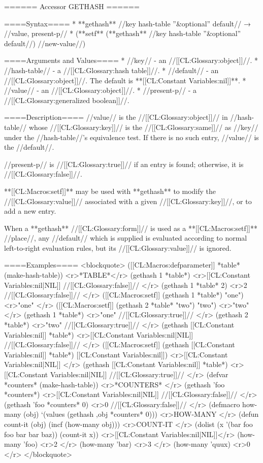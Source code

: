 ====== Accessor GETHASH ======

====Syntax====
  * **gethash** //key hash-table ''&optional'' default// → //value, present-p// 
  * (**setf** (**gethash** //key hash-table ''&optional'' default//) //new-value//)

====Arguments and Values====
  * //key// - an //[[CL:Glossary:object]]//.
  * //hash-table// - a //[[CL:Glossary:hash table]]//.
  * //default// - an //[[CL:Glossary:object]]//. The default is **[[CL:Constant Variables:nil]]**.
  * //value// - an //[[CL:Glossary:object]]//.
  * //present-p// - a //[[CL:Glossary:generalized boolean]]//.

====Description====
//value// is the //[[CL:Glossary:object]]// in //hash-table// whose //[[CL:Glossary:key]]// is the //[[CL:Glossary:same]]// as //key// under the //hash-table//'s equivalence test. If there is no such entry, //value// is the //default//.

//present-p// is //[[CL:Glossary:true]]// if an entry is found; otherwise, it is //[[CL:Glossary:false]]//.

**[[CL:Macros:setf]]** may be used with **gethash** to modify the //[[CL:Glossary:value]]// associated with a given //[[CL:Glossary:key]]//, or to add a new entry.

When a **gethash** //[[CL:Glossary:form]]// is used as a **[[CL:Macros:setf]]** //place//, any //default// which is supplied is evaluated according to normal left-to-right evaluation rules, but its //[[CL:Glossary:value]]// is ignored.

====Examples====
<blockquote>
([[CL:Macros:defparameter]] *table* (make-hash-table)) <r>*TABLE*</r>
(gethash 1 *table*) <r>[[CL:Constant Variables:nil|NIL]]
//[[CL:Glossary:false]]// </r>
(gethash 1 *table* 2) <r>2
//[[CL:Glossary:false]]// </r>
([[CL:Macros:setf]] (gethash 1 *table*) "one") <r>"one" </r>
([[CL:Macros:setf]] (gethash 2 *table* "two") "two") <r>"two" </r>
(gethash 1 *table*) <r>"one"
//[[CL:Glossary:true]]// </r>
(gethash 2 *table*) <r>"two"
//[[CL:Glossary:true]]// </r>
(gethash [[CL:Constant Variables:nil]] *table*) <r>[[CL:Constant Variables:nil|NIL]]
//[[CL:Glossary:false]]// </r>
([[CL:Macros:setf]] (gethash [[CL:Constant Variables:nil]] *table*) [[CL:Constant Variables:nil]]) <r>[[CL:Constant Variables:nil|NIL]] </r>
(gethash [[CL:Constant Variables:nil]] *table*) <r>[[CL:Constant Variables:nil|NIL]]
//[[CL:Glossary:true]]// </r>
(defvar *counters* (make-hash-table)) <r>*COUNTERS* </r>
(gethash 'foo *counters*) <r>[[CL:Constant Variables:nil|NIL]]
//[[CL:Glossary:false]]// </r>
(gethash 'foo *counters* 0) <r>0
//[[CL:Glossary:false]]// </r>
(defmacro how-many (obj) 
  `(values (gethash ,obj *counters* 0))) <r>HOW-MANY </r>
(defun count-it (obj) 
  (incf (how-many obj))) <r>COUNT-IT </r>
(dolist (x '(bar foo foo bar bar baz)) 
  (count-it x)) <r>[[CL:Constant Variables:nil|NIL]]</r>
(how-many 'foo) <r>2 </r>
(how-many 'bar) <r>3 </r>
(how-many 'quux) <r>0 </r>
</blockquote>

